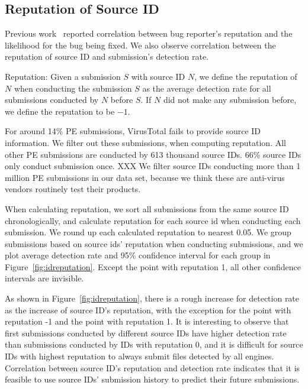 \subsection{Reputation of Source ID}
\label{sec:reputation}

Previous work~\cite{GuoICSE2010} reported correlation between bug reporter’s reputation and the likelihood for the bug being fixed. 
We also observe correlation between the reputation of source ID and submission’s detection rate. 

\begin{definition}{Reputation:}
Given a submission $S$ with source ID $N$, 
we define the reputation of $N$ when conducting the submission $S$ as the average detection rate for all submissions conducted by $N$ before $S$. 
If $N$ did not make any submission before, we define the reputation to be $-1$. 
\end{definition}

For around 14\% PE submissions, VirusTotal fails to provide source ID information. 
We filter out these submissions, when computing reputation.
All other PE submissions are conducted by 613 thousand source IDs. 
66\% source IDs only conduct submission once. 
XXX
We filter source IDs conducting more than 1 million PE submissions in our data set, 
because we think these are anti-virus vendors routinely test their products. 

When calculating reputation, we sort all submissions from the same source ID chronologically, 
and calculate reputation for each source id when conducting each submission. 
We round up each calculated reputation to nearest 0.05. 
We group submissions based on source ids' reputation when conducting submissions, 
and we plot average detection rate and 95\% confidence interval for each group in Figure~\ref{fig:idreputation}. 
Except the point with reputation 1, all other confidence intervals are invisible.  

As shown in Figure~\ref{fig:idreputation}, 
there is a rough increase for detection rate as the increase of source ID's reputation, 
with the exception for the point with reputation -1 and the point with reputation 1. 
It is interesting to observe that first submissions conducted by different source IDs have higher 
detection rate than submissions conducted by IDs with reputation 0, 
and it is difficult for source IDs with highest reputation to always submit files detected by all engines. 
Correlation between source ID's reputation and detection rate indicates 
that it is feasible to use source IDs' submission history to predict their future submissions.

